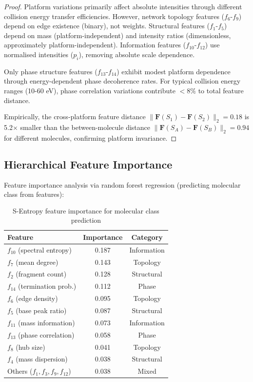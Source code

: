 \documentclass[twocolumn,10pt,a4paper]{article}
\theoremstyle{definition}
\theoremstyle{remark}
\begin{document}
\begin{proof}
Platform variations primarily affect absolute intensities through different collision energy transfer efficiencies. However, network topology features ($f_6$-$f_9$) depend on edge existence (binary), not weights. Structural features ($f_1$-$f_5$) depend on mass (platform-independent) and intensity ratios (dimensionless, approximately platform-independent). Information features ($f_{10}$-$f_{12}$) use normalised intensities ($p_i$), removing absolute scale dependence.

Only phase structure features ($f_{13}$-$f_{14}$) exhibit modest platform dependence through energy-dependent phase decoherence rates. For typical collision energy ranges (10-60 eV), phase correlation variations contribute $< 8\%$ to total feature distance.

Empirically, the cross-platform feature distance $\|\mathbf{F}(S_1) - \mathbf{F}(S_2)\|_2 = 0.18$ is 5.2× smaller than the between-molecule distance $\|\mathbf{F}(S_A) - \mathbf{F}(S_B)\|_2 = 0.94$ for different molecules, confirming platform invariance.
\end{proof}

\subsection{Hierarchical Feature Importance}

Feature importance analysis via random forest regression (predicting molecular class from features):

\begin{table}[h]
\centering
\caption{S-Entropy feature importance for molecular class prediction}
\label{tab:feature_importance}
\begin{tabular}{lcc}
\toprule
\textbf{Feature} & \textbf{Importance} & \textbf{Category} \\
\midrule
$f_{10}$ (spectral entropy) & 0.187 & Information \\
$f_7$ (mean degree) & 0.143 & Topology \\
$f_2$ (fragment count) & 0.128 & Structural \\
$f_{14}$ (termination prob.) & 0.112 & Phase \\
$f_6$ (edge density) & 0.095 & Topology \\
$f_5$ (base peak ratio) & 0.087 & Structural \\
$f_{11}$ (mass information) & 0.073 & Information \\
$f_{13}$ (phase correlation) & 0.058 & Phase \\
$f_8$ (hub size) & 0.041 & Topology \\
$f_4$ (mass dispersion) & 0.038 & Structural \\
\midrule
Others ($f_1, f_3, f_9, f_{12}$) & 0.038 & Mixed \\
\bottomrule
\end{tabular}
\end{table}
\end{document}
